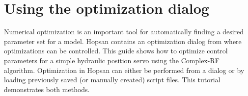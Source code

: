\documentclass[a4paper]{article}
\begin{document}

\section*{Using the optimization dialog}
Numerical optimization is an important tool for automatically finding a desired parameter set for a model. Hopsan contains an optimization dialog from where optimizations can be controlled. This guide shows how to optimize control parameters for a simple hydraulic position servo using the Complex-RF algorithm. Optimization in Hopsan can either be performed from a dialog or by loading previously saved (or manually created) script files. This tutorial demonstrates both methods.
\end{document}
